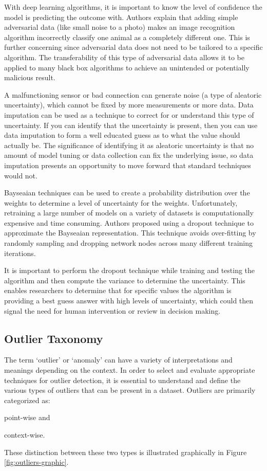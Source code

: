 With deep learning algorithms, it is important to know the level of confidence the model is predicting the outcome with. Authors \cite{explaining-adversarial-examples} explain that adding simple adversarial data (like small noise to a photo) makes an image recognition algorithm incorrectly classify one animal as a completely different one. This is further concerning since adversarial data does not need to be tailored to a specific algorithm. The transferability of this type of adversarial data allows it to be applied to many black box algorithms to achieve an unintended or potentially malicious result. 

A malfunctioning sensor or bad connection can generate noise (a type of aleatoric uncertainty), which cannot be fixed by more measurements or more data. Data imputation can be used as a technique to correct for or understand this type of uncertainty. If you can identify that the uncertainty is present, then you can use data imputation to form a well educated guess as to what the value should actually be. The significance of identifying it as aleatoric uncertainty is that no amount of model tuning or data collection can fix the underlying issue, so data imputation presents an opportunity to move forward that standard techniques would not.

Bayseaian techniques can be used to create a probability distribution over the weights to determine a level of uncertainty for the weights. Unfortunately, retraining a large number of models on a variety of datasets is computationally expensive and time consuming. Authors \cite{gal2016dropout} proposed using a dropout technique to approximate the Bayseaian representation. This technique avoids over-fitting by randomly sampling and dropping network nodes across many different training iterations.

It is important to perform the dropout technique while training and testing the algorithm and then compute the variance to determine the uncertainty. This enables researchers to determine that for specific values the algorithm is providing a best guess answer with high levels of uncertainty, which could then signal the need for human intervention or review in decision making.  

\subsection{Outlier Taxonomy}

The term `outlier' or `anomaly' can have a variety of interpretations and meanings depending on the context. In order to select and evaluate appropriate techniques for outlier detection, it is essential to understand and define the various types of outliers that can be present in a dataset. Outliers are primarily categorized as:
\begin{inlinelist}
    \item point-wise and
    \item context-wise.
\end{inlinelist}
These distinction between these two types is illustrated graphically in Figure \ref{fig:outliers-graphic}.

